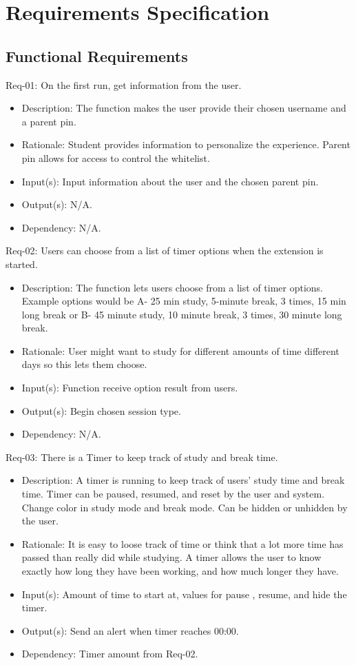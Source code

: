 \documentclass[12pt]{article}
\begin{document}
\section{Requirements Specification}
\subsection{Functional Requirements}
\noindent
Req-01: On the first run, get information from the user.
\begin{itemize}
    \item Description: The function makes the user provide their chosen username and a parent pin. 
    \item Rationale: Student provides information to personalize the experience. Parent pin allows for access to control the whitelist.
    \item Input(s): Input information about the user and the chosen parent pin.
    \item Output(s): N/A.
    \item Dependency: N/A.
\end{itemize}
Req-02: Users can choose from a list of timer options when the extension is started.
\begin{itemize}
    \item Description: The function lets users choose from a list of timer options. Example options would be A- 25 min study, 5-minute break, 3 times, 15 min long break or B- 45 minute study, 10 minute break, 3 times, 30 minute long break.
    \item Rationale: User might want to study for different amounts of time different days so this lets them choose.
    \item Input(s): Function receive option result from users.
    \item Output(s): Begin chosen session type.
    \item Dependency: N/A.
\end{itemize}
Req-03:  There is a Timer to keep track of study and break time.
\begin{itemize}
    \item Description: A timer is running to keep track of users’ study time and break time. Timer can be paused, resumed, and reset by the user and system. Change color in study mode and break mode. Can be hidden or unhidden by the user.
    \item Rationale: It is easy to loose track of time or think that a lot more time has passed than really did while studying. A timer allows the user to know exactly how long they have been working, and how much longer they have.
    \item Input(s): Amount of time to start at, values for pause , resume, and hide the timer.
    \item Output(s): Send an alert when timer reaches 00:00. 
    \item Dependency: Timer amount from Req-02.
\end{itemize}
\end{document}
